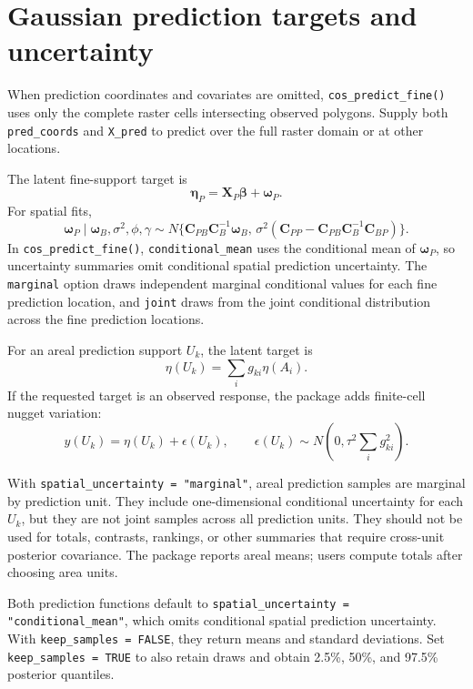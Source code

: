 \documentclass[11pt]{article}
\newcommand{\bbeta}{\bm{\beta}}
\newcommand{\bw}{\bm{\omega}}
\newcommand{\bC}{\bm{C}}
\newcommand{\bX}{\bm{X}}
\begin{document}
\section{Gaussian prediction targets and uncertainty}

When prediction coordinates and covariates are omitted,
\texttt{cos\_predict\_fine()} uses only the complete raster cells intersecting
observed polygons. Supply both \texttt{pred\_coords} and \texttt{X\_pred} to
predict over the full raster domain or at other locations.

The latent fine-support target is
\begin{equation}
  \bm{\eta}_P=\bX_P\bbeta+\bw_P.
\end{equation}
For spatial fits,
\begin{equation}
  \bw_P\mid \bw_B,\sigma^2,\phi,\gamma
  \sim
  N\{ \bC_{PB}\bC_B^{-1}\bw_B,\,
  \sigma^2(\bC_{PP}-\bC_{PB}\bC_B^{-1}\bC_{BP})\}.
\end{equation}
In \texttt{cos\_predict\_fine()}, \texttt{conditional\_mean} uses the
conditional mean of \(\bw_P\), so uncertainty summaries omit conditional
spatial prediction uncertainty. The \texttt{marginal} option draws independent
marginal conditional values for each fine prediction location, and
\texttt{joint} draws from the joint conditional distribution across the fine
prediction locations.

For an areal prediction support \(U_k\), the latent target is
\begin{equation}
  \eta(U_k) = \sum_i g_{ki}\eta(A_i).
\end{equation}
If the requested target is an observed response, the package adds finite-cell
nugget variation:
\begin{equation}
  y(U_k)=\eta(U_k)+\epsilon(U_k),
  \qquad
  \epsilon(U_k)\sim N\left(0,\tau^2\sum_i g_{ki}^2\right).
\end{equation}

With \texttt{spatial\_uncertainty = "marginal"}, areal prediction samples are
marginal by prediction unit. They include
one-dimensional conditional uncertainty for each \(U_k\), but they are not
joint samples across all prediction units. They should not be used for totals,
contrasts, rankings, or other summaries that require cross-unit posterior
covariance. The package reports areal means; users compute totals after
choosing area units.

Both prediction functions default to
\texttt{spatial\_uncertainty = "conditional\_mean"}, which omits conditional
spatial prediction uncertainty. With \texttt{keep\_samples = FALSE}, they
return means and standard deviations. Set \texttt{keep\_samples = TRUE} to
also retain draws and obtain 2.5\%, 50\%, and 97.5\% posterior quantiles.
\end{document}
